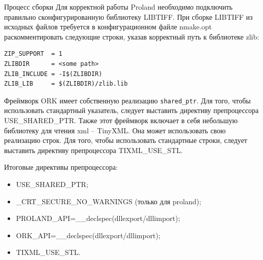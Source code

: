 \documentclass[12pt]{article}
\newcommand{\englishterm}[1]{\textenglish{\texttt{#1}}}
\begin{document}
\begin{section}{Процесс сборки}
Для корректной работы Proland необходимо подключить правильно сконфигурированную библиотеку LIBTIFF. При сборке LIBTIFF из исходных файлов требуется в конфигурационном файле nmake.opt раскомментировать следующие строки, указав корректный путь к библиотеке zlib:
\begin{lstlisting}
ZIP_SUPPORT	 = 1
ZLIBDIR 	 = <some path>
ZLIB_INCLUDE = -I$(ZLIBDIR)
ZLIB_LIB 	 = $(ZLIBDIR)/zlib.lib
\end{lstlisting}

Фреймворк ORK имеет собственную реализацию \englishterm{shared\_ptr}. Для того, чтобы использовать стандартный указатель, следует выставить директиву препроцессора USE\_SHARED\_PTR.
Также этот фреймворк включает в себя небольшую библиотеку для чтения xml -- TinyXML. Она может использовать свою реализацию строк. Для того, чтобы использовать стандартные строки, следует выставить директиву препроцессора TIXML\_USE\_STL.

Итоговые директивы препроцессора:
\begin{itemize}
    \item USE\_SHARED\_PTR;
    \item \_CRT\_SECURE\_NO\_WARNINGS (только для proland);
    \item PROLAND\_API=\_\_declspec(dllexport/dllimport);
    \item ORK\_API=\_\_declspec(dllexport/dllimport);
    \item TIXML\_USE\_STL.
\end{itemize}
\end{section}
\end{document}
